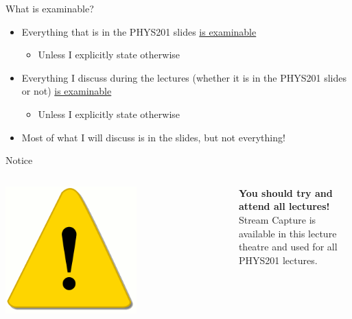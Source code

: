 %
%
%

\begin{frame}{What is examinable?}

\begin{itemize}
  \item Everything that is in the PHYS201 slides \underline{is examinable}
  \begin{itemize}
      \item Unless I explicitly state otherwise
  \end{itemize}

  \vspace{0.3cm}

  \item Everything I discuss during the lectures (whether it is in the PHYS201 slides or not) \underline{is examinable}
  \begin{itemize}
      \item Unless I explicitly state otherwise
  \end{itemize}

  \vspace{0.3cm}

  \item Most of what I will discuss is in the slides, but not everything!

\end{itemize}


\begin{block001}{Notice}
\begin{columns}
  \begin{column}{0.15\textwidth}
   \begin{center}
     \includegraphics[width=0.60\textwidth]{./images/icons/warning.png}\\
   \end{center}
  \end{column}
  \begin{column}{0.85\textwidth}
  {\small
     {\bf You should try and attend all lectures!}\\
     Stream Capture is available in this lecture theatre and used for all PHYS201 lectures.
   }
  \end{column}
\end{columns}
\end{block001}

\end{frame}

